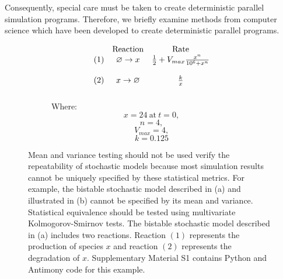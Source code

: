 \documentclass[journal,transmag,twoside]{IEEEtran}
\begin{document}
Consequently, special care must be taken to create deterministic parallel simulation programs. Therefore, we briefly examine methods from computer science which have been developed to create deterministic parallel programs.

\begin{figure}
  \centering
  \begin{subfigure}[b]{0.5\textwidth}
    \centering
    \[
    \begin{array}{c c c}
       & \textrm{Reaction} & \textrm{Rate} \\
      \left( 1 \right) & \varnothing \to x & \frac{1}{2} + V_{max} \frac{x^n}{10^6 + x^n} \\ \\
      \left( 2 \right) & x \to \varnothing & \frac{k}{x} \\ \\
    \end{array}
    \]
    Where:
    \[
      x = 24 ~ \textrm{at} ~ t = 0,
    \]
    \[
      n = 4,
    \]
    \[
      V_{max} = 4,
    \]
    \[
      k = 0.125
    \]
    \vspace{3em}
  \end{subfigure}%
  \begin{subfigure}[b]{0.5\textwidth}
    \centering
    
  \end{subfigure}
  \caption{Mean and variance testing should not be used verify the repeatability of stochastic models because most simulation results cannot be uniquely specified by these statistical metrics. For example, the bistable stochastic model described in (a) and illustrated in (b) cannot be specified by its mean and variance. Statistical equivalence should be tested using multivariate Kolmogorov-Smirnov tests. The bistable stochastic model described in (a) includes two reactions. Reaction $\left( 1 \right)$ represents the production of species $x$ and reaction $\left( 2 \right)$ represents the degradation of $x$. Supplementary Material S1 contains Python and Antimony \cite{smith2009antimony} code for this example.}
  \label{fig_bistable_plot}
\end{figure}
\end{document}
